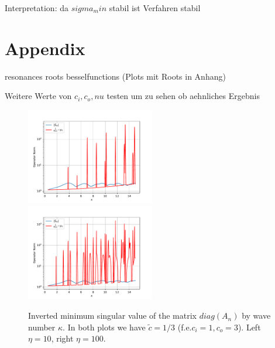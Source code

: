 \documentclass[10pt,journal,compsoc, onecolumn]{IEEEtran}
\begin{document}
Interpretation: da $sigma_min$ stabil ist Verfahren stabil 

\section{Appendix}
resonances roots besselfunctions (Plots mit Roots in Anhang)

Weitere Werte von $c_i, c_o, nu$ testen um zu sehen ob aehnliches Ergebnis 

\begin{figure}
    \includegraphics[width=0.5\textwidth]{InvertedMinimumSingularValuec_i1,0c_o3,0N_100eta10plotRangeStart_0,5plotRangeEnd_15,0indexrange_-4,0-0,0_y_0_49,583049675703265.pdf}
    \includegraphics[width=0.5\textwidth]{InvertedMinimumSingularValuec_i1,0c_o3,0N_100eta100,0plotRangeStart_0,5plotRangeEnd_15,0indexrange_-4,0-0,0_y_0_60,25228495804688.pdf}
    \caption{Inverted minimum singular value of the matrix $diag(A_n)$ by wave number $\kappa$. 
     In both plots we have $\tilde c = 1/3$ (f.e.$c_i = 1, c_o = 3$).
     Left $\eta = 10$, right $\eta = 100$.
    }
     \label{fig:vary_eta}
\end{figure}
\end{document}
